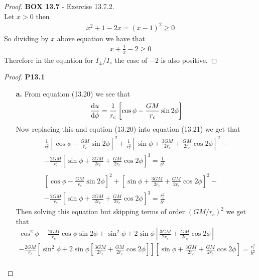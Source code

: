 \documentclass[11pt]{article}
\theoremstyle{definition}
\begin{document}
\cleardoublepage
\begin{proof}{\textbf{BOX 13.7} - Exercise 13.7.2.}\\
    Let $x > 0$ then
    \begin{align*}
        x^2 + 1 -2x = (x - 1)^2 \geq 0
    \end{align*}
    So dividing by $x$ above equation we have that
    \begin{align*}
        x + \frac{1}{x} -2 \geq 0
    \end{align*}
    Therefore in the equation for $I_{\pm}/I_s$ the case of $-2$ is also
    positive.
\end{proof}

\cleardoublepage
\begin{proof}{\textbf{P13.1}}
\begin{itemize}
\item [\textbf{a.}] From equation (13.20) we see that
\begin{align*}
    \dv{u}{\phi} = \frac{1}{r_c}\left[ \cos\phi - \frac{GM}{r_c} \sin2\phi\right]
\end{align*}
Now replacing this and eqution (13.20) into equation (13.21) we get that
\begin{align*}
    \frac{1}{r_c^2}\left[\cos\phi - \frac{GM}{r_c} \sin 2\phi\right]^2
    + \frac{1}{r_c^2}
    \left[\sin\phi + \frac{3GM}{2r_c} + \frac{GM}{2r_c}\cos 2\phi\right]^2 - \\
    - \frac{2GM}{r_c^3}
    \left[\sin\phi + \frac{3GM}{2r_c} + \frac{GM}{2r_c}\cos 2\phi\right]^3
    = \frac{1}{b^2}\\
    \\
    \left[\cos\phi - \frac{GM}{r_c} \sin 2\phi\right]^2
    + \left[\sin\phi + \frac{3GM}{2r_c} + \frac{GM}{2r_c}\cos 2\phi\right]^2 -\\
    - \frac{2GM}{r_c}
    \left[\sin\phi + \frac{3GM}{2r_c} + \frac{GM}{2r_c}\cos 2\phi\right]^3
    = \frac{r_c^2}{b^2}
\end{align*}
Then solving this equation but skipping terms of order $(GM/r_c)^2$ we get that
\begin{align*}
    \cos^2\phi - \frac{2GM}{r_c}\cos\phi\sin 2\phi
    + \sin^2\phi + 2\sin\phi\left[\frac{3GM}{2r_c} + \frac{GM}{2r_c}\cos 2\phi\right] -\\
    - \frac{2GM}{r_c}
    \left[\sin^2\phi + 2\sin\phi\left[\frac{3GM}{2r_c} + \frac{GM}{2r_c}\cos 2\phi\right]\right]
    \left[\sin\phi + \frac{3GM}{2r_c} + \frac{GM}{2r_c}\cos 2\phi\right]
    = \frac{r_c^2}{b^2}\\

\end{align*}
\end{itemize}
\end{proof}
\end{document}
